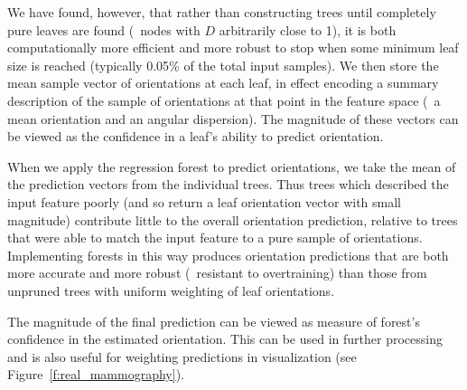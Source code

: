 \documentclass[10pt,twocolumn,letterpaper]{article}
\newcommand{\fref}[1]{Figure~\ref{#1}}
\def\dtcwt{DT-$\mathbb{C}$WT}
\newcommand{\comment}[1]{}
\begin{document}
We have found, however, that rather than constructing trees until completely pure leaves are found (\ie~nodes with $D$ arbitrarily close to 1), it is both computationally more efficient and more robust to stop when some minimum leaf size is reached (typically 0.05\% of the total input samples). We then store the mean sample vector of orientations at each leaf, in effect encoding a summary description of the sample of orientations at that point in the feature space (\ie~a mean orientation and an angular dispersion). The magnitude of these vectors can be viewed as the confidence in a leaf's ability to predict orientation.

When we apply the regression forest to predict orientations, we take the mean of the prediction vectors from the individual trees. Thus trees which described the input feature poorly (and so return a leaf orientation vector with small magnitude) contribute little to the overall orientation prediction, relative to trees that were able to match the input feature to a pure sample of orientations. Implementing forests in this way produces orientation predictions that are both more accurate and more robust (\ie~resistant to overtraining) than those from unpruned trees with uniform weighting of leaf orientations.

The magnitude of the final prediction can be viewed as measure of forest's confidence in the estimated orientation. This can be used in further processing and is also useful for weighting predictions in visualization (see \fref{f:real_mammography}).


\comment{
\item When estimating orientation with a tree (or forest of trees), there is a particular problem when the output is limited to a specific range e.g. (0,2pi]. At the two extremes of the range, samples in the bins near the end are biased toward the centre of the range such that, in our case, it is very unlikely that a 0 or 2pi will be output by the forest.
Random Forests (or trees for that matter) have the option of giving us a multimodal distribution over orientation which will be useful at points where lines cross.
One advantage of the (pruned) tree approach is that each bin contains a number of training samples such that we can estimate a mean value and an uncertainty (variance) for every leaf. In other words, the variance is very much data dependent.
This then propagates in the case of a Random Forest since the individual tree outputs can be combined with their respective variance accounted for correctly.
The output from the Random Forest is always between 0 and 1 in magnitude. Question: should we be taking the square root of the complex vector to halve the angle (and therefore sqrt the magnitude also)? At the moment, vectors are weighed by their unsquared magnitude.
}
\end{document}
